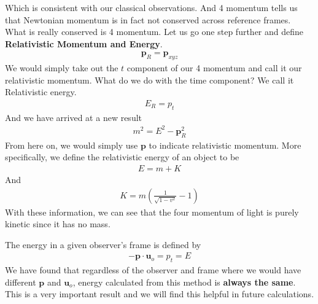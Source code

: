 \documentclass[12pt]{book}
\newcommand{\paren}[1]{\left( #1 \right)}
\begin{document}
Which is consistent with our classical observations. And 4 momentum tells us that Newtonian momentum is in fact not conserved across reference frames. What is really conserved is 4 momentum. Let us go one step further and define \textbf{Relativistic Momentum and Energy}.
\begin{align}
\mathbf{p}_R = \mathbf{p}_{xyz} 
\end{align}
We would simply take out the $t$ component of our 4 momentum and call it our relativistic momentum. What do we do with the time component? We call it Relativistic energy.
\begin{align}
E_R = p_t
\end{align}
And we have arrived at a new result
\begin{align}
m^2 = E^2 - \mathbf{p}_R^2
\end{align}
From here on, we would simply use $\mathbf{p}$ to indicate relativistic momentum. More specifically, we define the relativistic energy of an object to be
\begin{align}
E = m + K
\end{align}
And 
\begin{align}
K = m\paren{\frac{1}{\sqrt{1-v^2}}-1}
\end{align}
With these information, we can see that the four momentum of light is purely kinetic since it has no mass. 

The energy in a given observer's frame is defined by
\begin{align}
-\mathbf{p}\cdot \mathbf{u}_{o} = p_t = E
\end{align}
We have found that regardless of the observer and frame where we would have different $\mathbf{p}$ and $\mathbf{u}_o$, energy calculated from this method is \textbf{always the same}. This is a very important result and we will find this helpful in future calculations. 
\end{document}
